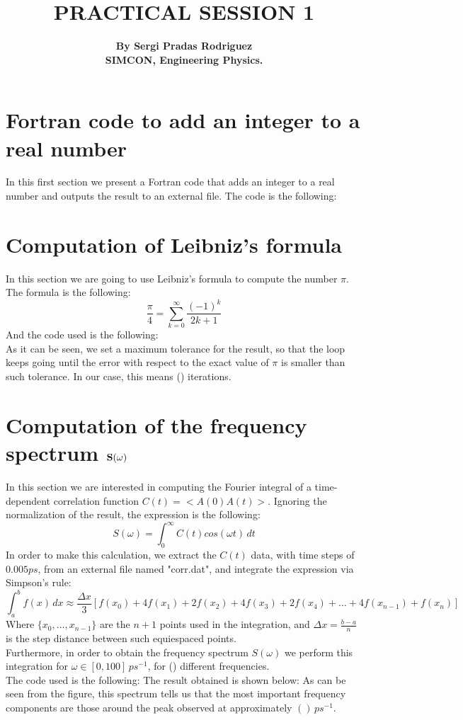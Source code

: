 \documentclass{article}
\title{\textbf{PRACTICAL SESSION 1}}
\author{\textbf{By Sergi Pradas Rodriguez} \\
\textbf{SIMCON, Engineering Physics.}}
\date{}
\begin{document}
\maketitle

\section{Fortran code to add an integer to a real number}
In this first section we present a Fortran code that adds an integer to a real number and outputs the result to an external file. The code is the following:\\
\section{Computation of Leibniz's formula}
In this section we are going to use Leibniz's formula to compute the number $\pi$. The formula is the following:
 \begin{equation}
     \frac{\pi}{4} = \sum_{k=0}^{\infty}\frac{(-1)^k}{2k+1}
 \end{equation}
And the code used is the following:\\
As it can be seen, we set a maximum tolerance for the result, so that the loop keeps going until the error with respect to the exact value of $\pi$ is smaller than such tolerance. In our case, this means () iterations.
\section{Computation of the frequency spectrum $\bf{S(\omega)}$}
In this section we are interested in computing the Fourier integral of a time-dependent correlation function $C(t)=<A(0)A(t)>$. Ignoring the normalization of the result, the expression is the following:
 \begin{equation}
   S(\omega)=\int_{0}^{\infty}C(t)cos(\omega t)\,dt
 \end{equation}
In order to make this calculation, we extract the $C(t)$ data, with time steps of $0.005 ps$, from an external file named "corr.dat", and integrate the expression via Simpson's rule:
\begin{equation}
  \int_{a}^{b}f(x)\,dx \approx \frac{\Delta x}{3} \left[ f(x_0)+4f(x_1)+2f(x_2)+4f(x_3)+2f(x_4)+ \dots +4f(x_{n-1})+f(x_n) \right]
\end{equation}
Where $\{x_0,\dots,x_{n-1}\}$ are the $n+1$ points used in the integration, and $\Delta x = \frac{b-a}{n}$ is the step distance between such equiespaced points.\\
Furthermore, in order to obtain the frequency spectrum $S(\omega)$ we perform this integration for $\omega \in [0,100] \,ps^{-1}$, for () different frequencies. \\
The code used is the following:
The result obtained is shown below:
As can be seen from the figure, this spectrum tells us that the most important frequency components are those around the peak observed at approximately $() \,ps^{-1}$.
\end{document}
